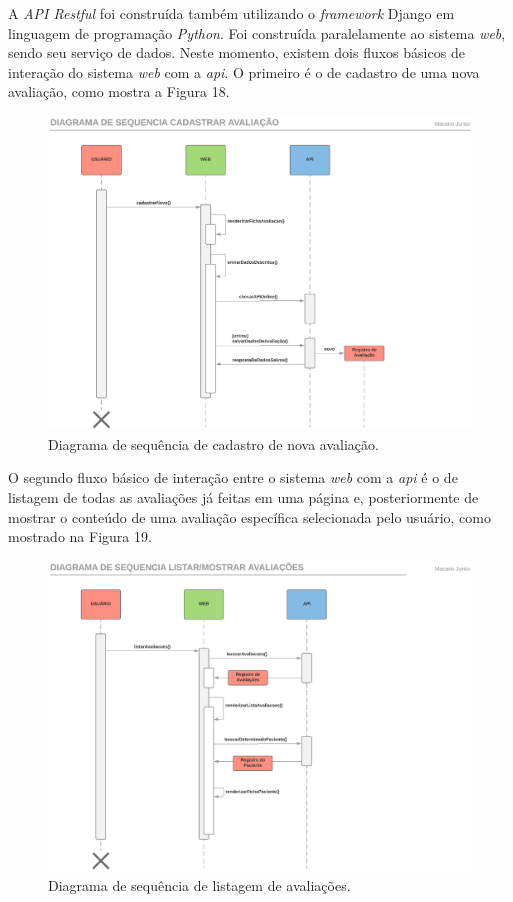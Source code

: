 	A \textit{API Restful} foi construída também utilizando o \textit{framework} Django em linguagem de programação \textit{Python}. Foi construída paralelamente ao sistema \textit{web}, sendo seu serviço de dados. Neste momento, existem dois fluxos básicos de interação do sistema \textit{web} com a \textit{api}. O primeiro é o de cadastro de uma nova avaliação, como mostra a Figura 18.

	\begin{figure}[ht]
	    \centering
	    \label{fig18}
	        \includegraphics[keepaspectratio=true, scale=0.55]{editaveis/images/sequencia_cadastrar.eps}
	    \caption{Diagrama de sequência de cadastro de nova avaliação.}
	\end{figure} 

	O segundo fluxo básico de interação entre o sistema \textit{web} com a \textit{api} é o de listagem de todas as avaliações já feitas em uma página e, posteriormente de mostrar o conteúdo de uma avaliação específica selecionada pelo usuário, como mostrado na Figura 19.

	\begin{figure}[ht]
	    \centering
	    \label{fig19}
	        \includegraphics[keepaspectratio=true, scale=0.55]{editaveis/images/sequencia_listar.eps}
	    \caption{Diagrama de sequência de listagem de avaliações.}
	\end{figure} 


